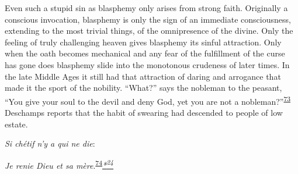 Even such a stupid sin as blasphemy only arises from strong faith.
Originally a conscious invocation, blasphemy is only the sign of an
immediate consciousness, extending to the most trivial things, of the
omnipresence of the divine. Only the feeling of truly challenging heaven
gives blasphemy its sinful attraction. Only when the oath becomes
mechanical and any fear of the fulfillment of the curse has gone does
blasphemy slide into the monotonous crudeness of later times. In the
late Middle Ages it still had that attraction of daring and arrogance
that made it the sport of the nobility. ``What?'' says the nobleman to
the peasant, ``You give your soul to the devil and deny God, yet you are
not a
nobleman?''\textsuperscript{\protect\hypertarget{13_Chapter_Six__THE_DEPICTION_OF_TH.xhtmlux5cux23id_1125}{\protect\hyperlink{23_NOTES.xhtmlux5cux23id_1126}{73}}}
Deschamps reports that the habit of swearing had descended to people of
low estate.

\emph{Si chétif n'y a qui ne die}:

\emph{Je renie Dieu et sa
mère}.\textsuperscript{\protect\hypertarget{13_Chapter_Six__THE_DEPICTION_OF_TH.xhtmlux5cux23id_1123}{\protect\hyperlink{23_NOTES.xhtmlux5cux23id_1124}{74}}}\emph{\protect\hypertarget{13_Chapter_Six__THE_DEPICTION_OF_TH.xhtmlux5cux23id_3035}{\protect\hyperlink{23_NOTES.xhtmlux5cux23id_3036}{*\textsuperscript{24}}}}

